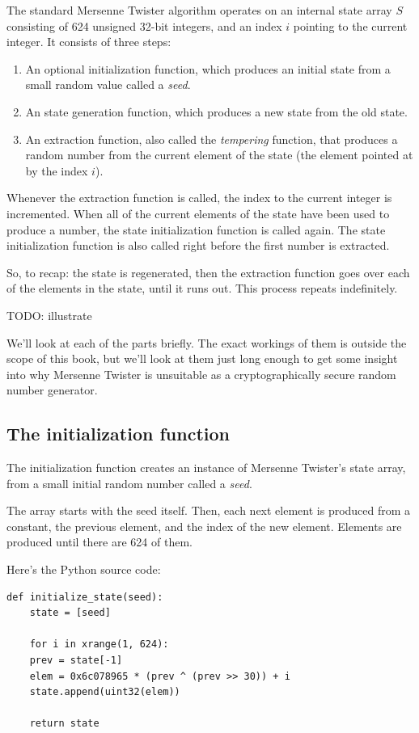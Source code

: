 \documentclass[11pt,ebook,table,dvipsnames]{memoir}
\begin{document}
The standard Mersenne Twister algorithm operates on an internal state
array $S$ consisting of 624 unsigned 32-bit integers, and an index $i$
pointing to the current integer. It consists of three steps:

\begin{enumerate}
\item An optional initialization function, which produces an initial
state from a small random value called a \emph{seed}.
\item An state generation function, which produces a new state from the
old state.
\item An extraction function, also called the \emph{tempering} function, that
produces a random number from the current element of the state (the
element pointed at by the index $i$).
\end{enumerate}

Whenever the extraction function is called, the index to the current
integer is incremented. When all of the current elements of the state
have been used to produce a number, the state initialization function
is called again. The state initialization function is also called
right before the first number is extracted.

So, to recap: the state is regenerated, then the extraction function
goes over each of the elements in the state, until it runs out. This
process repeats indefinitely.

TODO: illustrate

We'll look at each of the parts briefly. The exact workings of them is
outside the scope of this book, but we'll look at them just long
enough to get some insight into why Mersenne Twister is unsuitable as
a cryptographically secure random number generator.
\subsection{The initialization function}
\label{sec-2-10-6-2}

The initialization function creates an instance of Mersenne Twister's
state array, from a small initial random number called a \emph{seed}.

The array starts with the seed itself. Then, each next element is
produced from a constant, the previous element, and the index of the
new element. Elements are produced until there are 624 of them.

Here's the Python source code:

\begin{verbatim}
def initialize_state(seed):
    state = [seed]

    for i in xrange(1, 624):
	prev = state[-1]
	elem = 0x6c078965 * (prev ^ (prev >> 30)) + i
	state.append(uint32(elem))

    return state
\end{verbatim}
\end{document}
